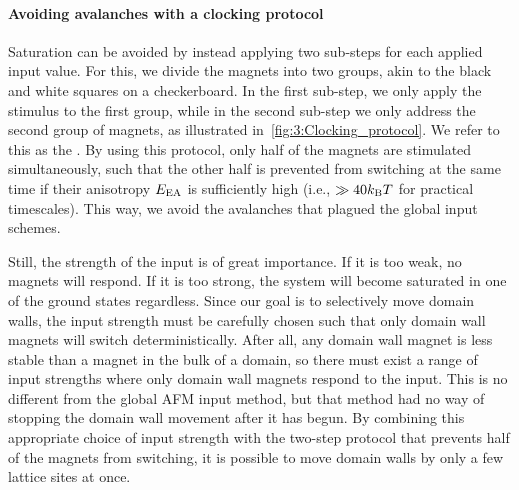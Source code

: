\paragraph{Avoiding avalanches with a clocking protocol}
Saturation can be avoided by instead applying two sub-steps for each applied input value.
For this, we divide the magnets into two groups, akin to the black and white squares on a checkerboard.
In the first sub-step, we only apply the stimulus to the first group, while in the second sub-step we only address the second group of magnets, as illustrated in~\cref{fig:3:Clocking_protocol}.
We refer to this as the .
By using this protocol, only half of the magnets are stimulated simultaneously, such that the other half is prevented from switching at the same time if their anisotropy $E_\mathrm{EA}$ is sufficiently high (i.e., $\gg 40\kBT$ for practical timescales).
This way, we avoid the avalanches that plagued the global input schemes. \par
Still, the strength of the input is of great importance.
If it is too weak, no magnets will respond.
If it is too strong, the system will become saturated in one of the ground states regardless.
Since our goal is to selectively move domain walls, the input strength must be carefully chosen such that only domain wall magnets will switch deterministically. %
After all, any domain wall magnet is less stable than a magnet in the bulk of a domain, so there must exist a range of input strengths where only domain wall magnets respond to the input.
This is no different from the global AFM input method, but that method had no way of stopping the domain wall movement after it has begun.
By combining this appropriate choice of input strength with the two-step protocol that prevents half of the magnets from switching, it is possible to move domain walls by only a few lattice sites at once.


